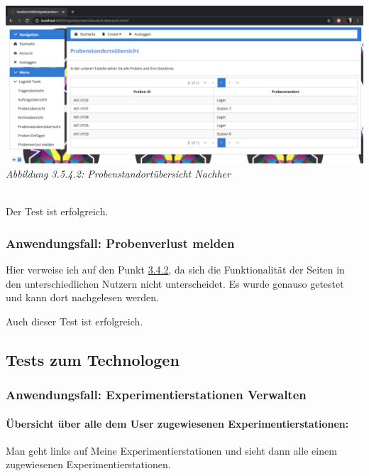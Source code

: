 \documentclass[enabledeprecatedfontcommands,fontsize=12pt,paper=a4,twoside]{scrartcl}
\begin{document}
 \hypertarget{sc3.5.4.2}{
\includegraphics[width=1\textwidth]{Screenshots/3542.png}
\textit{Abbildung 3.5.4.2: Probenstandortübersicht Nachher}
} \\

Der Test ist erfolgreich.



\subsubsection{Anwendungsfall: Probenverlust melden}

Hier verweise ich auf den Punkt \hyperlink{3.4.2}{3.4.2}, da sich die Funktionalität der Seiten in den unterschiedlichen Nutzern nicht unterscheidet. Es wurde genauso getestet und kann dort nachgelesen werden. 

Auch dieser Test ist erfolgreich. 


\subsection{Tests zum Technologen}

\subsubsection{Anwendungsfall: Experimentierstationen Verwalten}

\paragraph{Übersicht über alle dem User zugewiesenen Experimentierstationen:}

Man geht links auf Meine Experimentierstationen und sieht dann alle einem zugewiesenen Experimentierstationen. 
\end{document}
